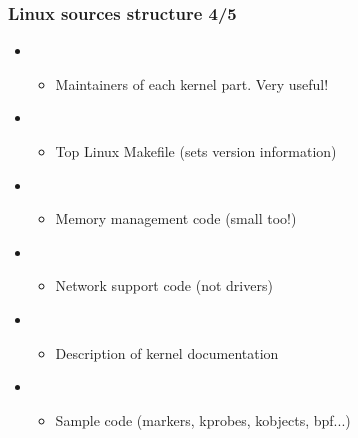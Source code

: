 \begin{frame}
  \frametitle{Linux sources structure 4/5}
  \begin{itemize}
  \item {}
    \begin{itemize}
    \item Maintainers of each kernel part. Very useful!
    \end{itemize}
  \item {}
    \begin{itemize}
    \item Top Linux Makefile (sets version information)
    \end{itemize}
  \item {}
    \begin{itemize}
    \item Memory management code (small too!)
    \end{itemize}
  \item {}
    \begin{itemize}
    \item Network support code (not drivers)
    \end{itemize}
  \item {}
    \begin{itemize}
    \item Description of kernel documentation
    \end{itemize}
  \item {}
    \begin{itemize}
    \item Sample code (markers, kprobes, kobjects, bpf...)
    \end{itemize}
  \end{itemize}
\end{frame}

